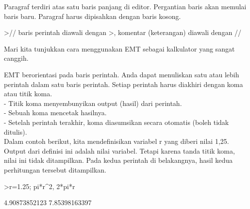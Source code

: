 \begin{eulernotebook}
\begin{eulercomment}
        Paragraf terdiri atas satu baris panjang di editor. Pergantian baris
        akan memulai baris baru. Paragraf harus dipisahkan dengan baris
        kosong.
    \end{eulercomment}
    \begin{eulerprompt}
>// baris perintah diawali dengan >, komentar (keterangan) diawali dengan //
    \end{eulerprompt}
    \begin{eulercomment}
        Mari kita tunjukkan cara menggunakan EMT sebagai kalkulator yang sangat
        canggih.
        
        EMT berorientasi pada baris perintah. Anda dapat menuliskan satu atau lebih
        perintah dalam satu baris perintah. Setiap perintah harus diakhiri dengan koma
        atau titik koma.\\
        
        - Titik koma menyembunyikan output (hasil) dari perintah.\\
        - Sebuah koma mencetak hasilnya.\\
        - Setelah perintah terakhir, koma diasumsikan secara otomatis (boleh tidak
        ditulis).\\
        
        Dalam contoh berikut, kita mendefinisikan variabel r yang diberi nilai 1,25.
        Output dari definisi ini adalah nilai variabel. Tetapi karena tanda titik koma,
        nilai ini tidak ditampilkan. Pada kedua perintah di belakangnya, hasil kedua
        perhitungan tersebut ditampilkan.
    \end{eulercomment}
    \begin{eulerprompt}
>r=1.25; pi*r^2, 2*pi*r
    \end{eulerprompt}
    \begin{euleroutput}
  4.90873852123
  7.85398163397 \\
    \end{euleroutput}
    
    \begin{eulercomment}


\end{eulercomment}
\end{eulernotebook}
